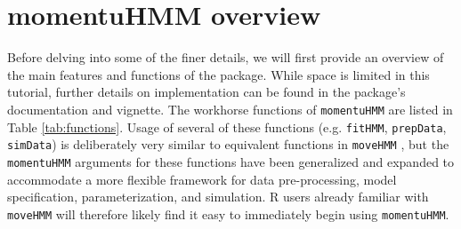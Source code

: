 \documentclass[12pt]{article}
\begin{document}
\section{momentuHMM overview}
Before delving into some of the finer details, we will first provide an overview of the main features and functions of the package. While space is limited in this tutorial, further details on implementation can be found in the package's documentation and vignette. The workhorse functions of \verb|momentuHMM| are listed in Table \ref{tab:functions}. Usage of several of these functions (e.g. \verb|fitHMM|, \verb|prepData|, \verb|simData|) is deliberately very similar to equivalent functions in \verb|moveHMM| \citep{MichelotEtAl2016} , but the \verb|momentuHMM| arguments for these functions have been generalized and expanded to accommodate a more flexible framework for data pre-processing, model specification, parameterization, and simulation. R users already familiar with \verb|moveHMM| will therefore likely find it easy to immediately begin using \verb|momentuHMM|. %
\end{document}
